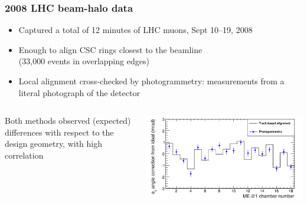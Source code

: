 \documentclass[compress]{beamer}
\begin{document}
\begin{frame}
\frametitle{2008 LHC beam-halo data}

\begin{itemize}
\item Captured a total of 12 minutes of LHC muons, Sept 10--19, 2008
\item Enough to align CSC rings closest to the beamline \\ (33,000 events in overlapping edges)
\item Local alignment cross-checked by photogrammetry: measurements from a literal photograph of the detector
\end{itemize}

\vspace{0.2 cm}
\begin{columns}
Both methods observed (expected) differences with respect to the design geometry, with high correlation

\hspace{-1 cm} \includegraphics[width=1.1\linewidth]{data_correlations.png}
\end{columns}
\end{frame}
\end{document}
